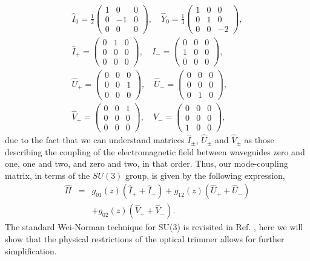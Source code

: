 \documentclass[9pt,twocolumn,twoside]{osajnl}
\begin{document}
\begin{eqnarray}
\hat{I}_{0} = \frac{1}{2} \left( \begin{array}{ccc} 1&0&0\\0&-1&0\\0&0&0 \end{array}\right), \quad  
\hat{Y}_{0} = \frac{1}{3} \left( \begin{array}{ccc} 
1&0&0\\0&1&0\\0&0&-2    \end{array}\right), \nonumber\\
\hat{I}_{+} = \left( \begin{array}{ccc} 0&1&0\\0&0&0\\0&0&0 \end{array}\right), \quad 
\hat{I}_{-} = \left( \begin{array}{ccc} 0&0&0\\1&0&0\\0&0&0 \end{array}\right), \quad \nonumber\\
\hat{U}_{+} = \left( \begin{array}{ccc} 0&0&0\\0&0&1\\0&0&0 \end{array}\right), \quad 
\hat{U}_{-} = \left( \begin{array}{ccc} 0&0&0\\0&0&0\\0&1&0 \end{array}\right), \quad \nonumber \\
\hat{V}_{+} = \left( \begin{array}{ccc} 0&0&1\\0&0&0\\0&0&0 \end{array}\right), \quad 
\hat{V}_{-} = \left( \begin{array}{ccc} 0&0&0\\0&0&0\\1&0&0 \end{array}\right), \label{eq:gens}
\end{eqnarray}
due to the fact that we can understand matrices $\hat{I}_{\pm}$, $\hat{U}_{\pm}$ and $\hat{V}_{\pm}$ as those describing the coupling of the electromagnetic field between waveguides zero and one, one and two, and zero and two, in that order.
Thus, our mode-coupling matrix, in terms of the $SU(3)$ group, is given by the following expression,
\begin{eqnarray}
	\hat{H} &=& g_{01}(z) \left( \hat{I}_{+} + \hat{I}_{-} \right) + g_{12}(z) \left( \hat{U}_{+} + \hat{U}_{-} \right)\nonumber \\
	 & & +  g_{02}(z) \left( \hat{V}_{+} + \hat{V}_{-} \right).
\end{eqnarray}
The standard Wei-Norman technique for SU(3) is revisited in Ref. \cite{Dattoli1987p1582}, here we will show that the physical restrictions of the optical trimmer allows for further simplification.
\end{document}
